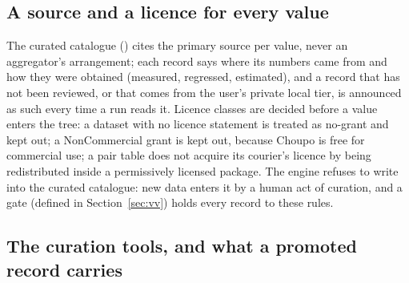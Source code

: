 \documentclass[11pt,a4paper]{article}
\newcommand{\code}[1]{\texttt{\detokenize{#1}}}
\begin{document}
\subsection{A source and a licence for every value}

The curated catalogue (\code{data/standards/}) cites the primary source per
value, never an aggregator's arrangement; each record says where its
numbers came from and how they were obtained (measured, regressed,
estimated), and a record that has not been reviewed, or that comes from the
user's private local tier, is announced as such every time a run reads it.
Licence classes are decided before a value enters the tree: a dataset with
no licence statement is treated as no-grant and kept out; a NonCommercial
grant is kept out, because Choupo is free for commercial use; a pair table
does not acquire its courier's licence by being redistributed inside a
permissively licensed package.  The engine refuses to write into the
curated catalogue: new data enters it by a human act of curation, and a
gate (defined in Section~\ref{sec:vv}) holds every record to these rules.

\subsection{The curation tools, and what a promoted record carries}
\end{document}
